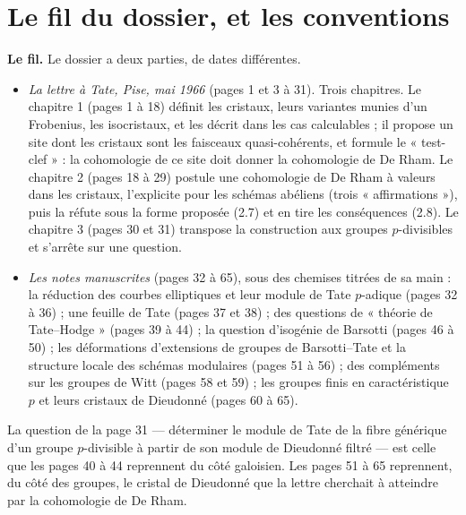 \documentclass[11pt,a4paper]{article}
\begin{document}
\section*{Le fil du dossier, et les conventions}

\textbf{Le fil.} Le dossier a deux parties, de dates différentes.

\begin{itemize}
\item \emph{La lettre à Tate, Pise, mai 1966} (pages 1 et 3 à 31). Trois
chapitres. Le chapitre 1 (pages 1 à 18) définit les cristaux, leurs variantes
munies d'un Frobenius, les isocristaux, et les décrit dans les cas
calculables ; il propose un site dont les cristaux sont les faisceaux
quasi-cohérents, et formule le « test-clef » : la cohomologie de ce site
doit donner la cohomologie de De Rham. Le chapitre 2 (pages 18 à 29) postule
une cohomologie de De Rham à valeurs dans les cristaux, l'explicite pour les
schémas abéliens (trois « affirmations »), puis la réfute sous la forme
proposée (2.7) et en tire les conséquences (2.8). Le chapitre 3 (pages 30 et
31) transpose la construction aux groupes $p$-divisibles et s'arrête sur une
question.
\item \emph{Les notes manuscrites} (pages 32 à 65), sous des chemises
titrées de sa main : la réduction des courbes elliptiques et leur module de
Tate $p$-adique (pages 32 à 36) ; une feuille de Tate (pages 37 et 38) ; des
questions de « théorie de Tate--Hodge » (pages 39 à 44) ; la question
d'isogénie de Barsotti (pages 46 à 50) ; les déformations d'extensions de
groupes de Barsotti--Tate et la structure locale des schémas modulaires
(pages 51 à 56) ; des compléments sur les groupes de Witt (pages 58 et 59) ;
les groupes finis en caractéristique $p$ et leurs cristaux de Dieudonné
(pages 60 à 65).
\end{itemize}

La question de la page 31 — déterminer le module de Tate de la fibre générique
d'un groupe $p$-divisible à partir de son module de Dieudonné filtré — est
celle que les pages 40 à 44 reprennent du côté galoisien. Les pages 51 à 65
reprennent, du côté des groupes, le cristal de Dieudonné que la lettre
cherchait à atteindre par la cohomologie de De Rham.
\end{document}
